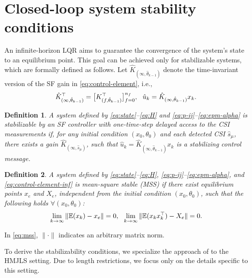 \documentclass[journal,twoside,web]{ieeecolor}
\newtheorem{definition}{Definition}
\begin{document}
\section{Closed-loop system stability conditions}\label{sec:stability}
An infinite-horizon LQR aims to guarantee the convergence of the system's state to an equilibrium point. This goal can be achieved only for stabilizable systems, which are formally defined as follows. Let $\hat{K}_{(\infty,\hat{\theta}_{k-1})}$ denote the time-invariant version of the SF gain in \eqref{eq:control-element}, i.e.,
\begin{equation}\label{eq:control-element-inf}
	\text{\small $\hat{K}_{(\infty,\hat{\theta}_{k-1})}^{\top} = \big[K_{(f,\hat{\theta}_{k-1})}^{\top}\big]_{f=0}^{n_f},~~
    \hat{u}_{k}=\hat{K}_{(\infty,\hat{\theta}_{k-1})}x_k.$}
\end{equation}
\begin{definition}\label{def:stabiliz} 
A system defined by \eqref{eq:state}–\eqref{eq:H} and \eqref{eq:p-ij}–\eqref{eq:epm-alpha} is stabilizable by %
an SF controller with one-time-step delayed access to the CSI measurements 
if, for any initial condition $(x_0,\theta_0)$ and each detected CSI $\hat{s}_{\mu}$, there exists a gain $\hat{K}_{(\infty,\hat{s}_{\mu})}$, such that  $\hat{u}_{k}=\hat{K}_{(\infty,\hat{\theta}_{k-1})}x_k$ is a stabilizing control message. %
\end{definition}
\begin{definition}\label{def:mss}
A system defined by \eqref{eq:state}–\eqref{eq:H}, \eqref{eq:p-ij}–\eqref{eq:epm-alpha}, and \eqref{eq:control-element-inf}
is mean-square stable (MSS) if there exist equilibrium points $x_{e}$ and $X_{e}$, independent from the initial condition $(x_0,\theta_0)$, such that the following holds $\forall (x_0,\theta_0)$:
\begin{equation}\label{eq:mss}
        \text{\small $\lim_{k \to \infty} \|\mathbb{E} (x_k)-x_{e} \| = 0,~~
        \lim_{k \to \infty} \|\mathbb{E} (x_k x_k^{\top} )-X_{e}\| = 0.$}
\end{equation}
\end{definition}
In \eqref{eq:mss}, $\|\cdot\|$ indicates an arbitrary matrix norm.

To derive the stabilizability conditions, we specialize the approach of \cite[Sec. 5]{yZL-2025-automatica} to the HMJLS setting. Due to length restrictions, we focus only on the details specific to this setting.
\end{document}
